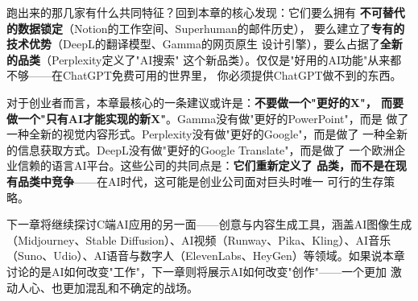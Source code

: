 跑出来的那几家有什么共同特征？回到本章的核心发现：它们要么拥有
\textbf{不可替代的数据锁定}（Notion的工作空间、Superhuman的邮件历史），
要么建立了\textbf{专有的技术优势}（DeepL的翻译模型、Gamma的网页原生
设计引擎），要么占据了\textbf{全新的品类}（Perplexity定义了"AI搜索"
这个新品类）。仅仅是"好用的AI功能"从来都不够——在ChatGPT免费可用的世界里，
你必须提供ChatGPT做不到的东西。

对于创业者而言，本章最核心的一条建议或许是：\textbf{不要做一个"更好的X"，
而要做一个"只有AI才能实现的新X"}。Gamma没有做"更好的PowerPoint"，而是
做了一种全新的视觉内容形式。Perplexity没有做"更好的Google"，而是做了
一种全新的信息获取方式。DeepL没有做"更好的Google Translate"，而是做了
一个欧洲企业信赖的语言AI平台。这些公司的共同点是：\textbf{它们重新定义了
品类，而不是在现有品类中竞争}——在AI时代，这可能是创业公司面对巨头时唯一
可行的生存策略。

下一章将继续探讨C端AI应用的另一面——创意与内容生成工具，涵盖AI图像生成
（Midjourney、Stable Diffusion）、AI视频（Runway、Pika、Kling）、AI音乐
（Suno、Udio）、AI语音与数字人（ElevenLabs、HeyGen）等领域。如果说本章
讨论的是AI如何改变"工作"，下一章则将展示AI如何改变"创作"——一个更加
激动人心、也更加混乱和不确定的战场。
